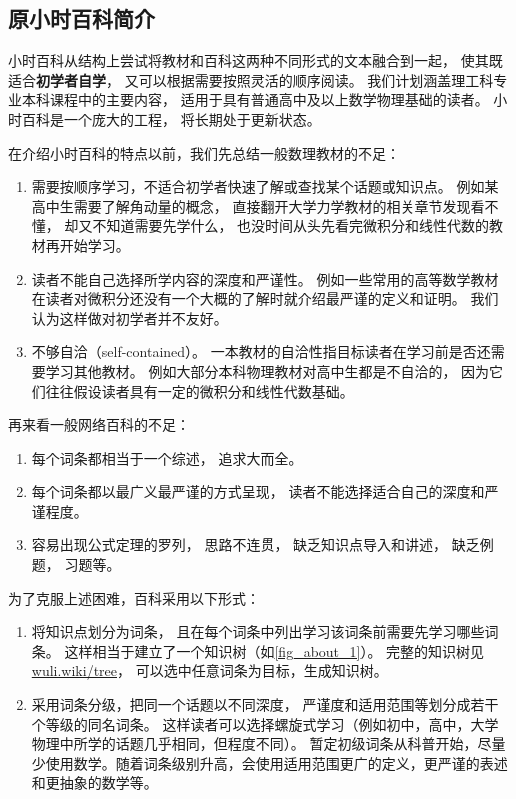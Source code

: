 \subsection{原小时百科简介}\label{sub_about_1}

小时百科从结构上尝试将教材和百科这两种不同形式的文本融合到一起， 使其既适合\textbf{初学者自学}， 又可以根据需要按照灵活的顺序阅读。 我们计划涵盖理工科专业本科课程中的主要内容， 适用于具有普通高中及以上数学物理基础的读者。 小时百科是一个庞大的工程， 将长期处于更新状态。

在介绍小时百科的特点以前，我们先总结一般数理教材的不足：
\begin{enumerate}
\item 需要按顺序学习，不适合初学者快速了解或查找某个话题或知识点。 例如某高中生需要了解角动量的概念， 直接翻开大学力学教材的相关章节发现看不懂， 却又不知道需要先学什么， 也没时间从头先看完微积分和线性代数的教材再开始学习。
\item 读者不能自己选择所学内容的深度和严谨性。 例如一些常用的高等数学教材在读者对微积分还没有一个大概的了解时就介绍最严谨的定义和证明。 我们认为这样做对初学者并不友好。
\item 不够自洽（self-contained）。 一本教材的自洽性指目标读者在学习前是否还需要学习其他教材。 例如大部分本科物理教材对高中生都是不自洽的， 因为它们往往假设读者具有一定的微积分和线性代数基础。
\end{enumerate}

再来看一般网络百科的不足：
\begin{enumerate}
\item 每个词条都相当于一个综述， 追求大而全。
\item 每个词条都以最广义最严谨的方式呈现， 读者不能选择适合自己的深度和严谨程度。
\item 容易出现公式定理的罗列， 思路不连贯， 缺乏知识点导入和讲述， 缺乏例题， 习题等。
\end{enumerate}

为了克服上述困难，百科采用以下形式：
\begin{enumerate}
\item 将知识点划分为词条， 且在每个词条中列出学习该词条前需要先学习哪些词条。 这样相当于建立了一个知识树（如\autoref{fig_about_1}）。 完整的知识树见 \href{https://wuli.wiki/tree}{wuli.wiki/tree}， 可以选中任意词条为目标，生成知识树。
\item 采用词条分级，把同一个话题以不同深度， 严谨度和适用范围等划分成若干个等级的同名词条。 这样读者可以选择螺旋式学习（例如初中，高中，大学物理中所学的话题几乎相同，但程度不同）。 暂定初级词条从科普开始，尽量少使用数学。随着词条级别升高，会使用适用范围更广的定义，更严谨的表述和更抽象的数学等。
\end{enumerate}

